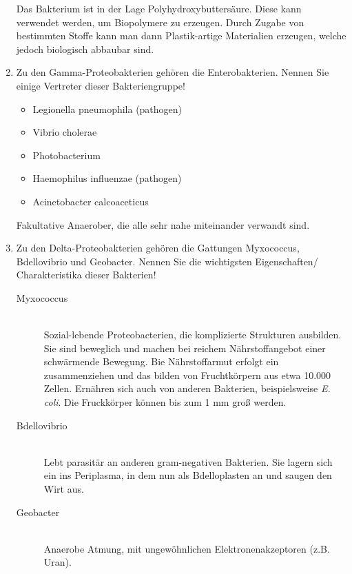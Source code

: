 \begin{enumerate}
		Das Bakterium ist in der Lage Polyhydroxybuttersäure.
		Diese kann verwendet werden,
		um Biopolymere zu erzeugen.
		Durch Zugabe von bestimmten Stoffe kann man dann Plastik-artige Materialien erzeugen,
		welche jedoch biologisch abbaubar sind.

	\item Zu den Gamma-Proteobakterien gehören die Enterobakterien. Nennen Sie einige Vertreter dieser Bakteriengruppe!
	
		\begin{itemize}
			\item Legionella pneumophila	\hfill (pathogen)
			\item Vibrio cholerae
			\item Photobacterium
			\item Haemophilus influenzae 	\hfill (pathogen)
			\item Acinetobacter calcoaceticus
		\end{itemize}

		Fakultative Anaerober, die alle sehr nahe miteinander verwandt sind.

	\item Zu den Delta-Proteobakterien gehören die Gattungen Myxococcus, Bdellovibrio und Geobacter. Nennen Sie die wichtigsten Eigenschaften/ Charakteristika dieser Bakterien!
		
		\begin{description} 
			\item[Myxococcus] \hfill \\
				Sozial-lebende Proteobacterien, die komplizierte Strukturen ausbilden.
				Sie sind beweglich und machen bei reichem Nährstoffangebot einer schwärmende Bewegung.
				Bie Nährstoffarmut erfolgt ein zusammenziehen und das bilden von Fruchtkörpern aus etwa 10.000 Zellen.
				Ernähren sich auch von anderen Bakterien, beispielsweise \emph{E. coli}.
				Die Fruckkörper können bis zum 1 mm  groß werden.
			\item[Bdellovibrio] \hfill \\
				Lebt parasitär an anderen gram-negativen Bakterien.
				Sie lagern sich ein ins Periplasma,
				in dem nun als Bdelloplasten an und saugen den Wirt aus.
			\item[Geobacter] \hfill \\
				Anaerobe Atmung, mit ungewöhnlichen Elektronenakzeptoren (z.B. Uran).
		\end{description}

\end{enumerate}

